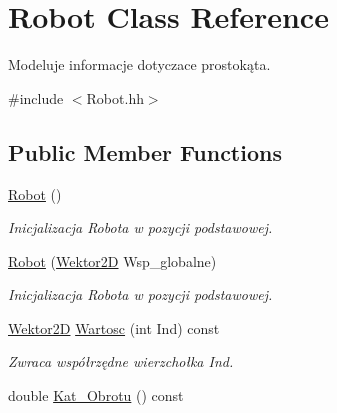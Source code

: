 \hypertarget{class_robot}{\section{Robot Class Reference}
\label{class_robot}
}


Modeluje informacje dotyczace prostokąta.  




{\ttfamily \#include $<$Robot.\+hh$>$}

\subsection*{Public Member Functions}
\begin{DoxyCompactItemize}
\item 
\hypertarget{class_robot_a4fc7c70ae20623f05e06f2ecb388b6c4}{\hyperlink{class_robot_a4fc7c70ae20623f05e06f2ecb388b6c4}{Robot} ()}\label{class_robot_a4fc7c70ae20623f05e06f2ecb388b6c4}

\begin{DoxyCompactList}\small\item\em Inicjalizacja Robota w pozycji podstawowej. \end{DoxyCompactList}\item 
\hypertarget{class_robot_a57616442d2907ac8a7e4e124d82b5ba3}{\hyperlink{class_robot_a57616442d2907ac8a7e4e124d82b5ba3}{Robot} (\hyperlink{class_wektor2_d}{Wektor2\+D} Wsp\+\_\+globalne)}\label{class_robot_a57616442d2907ac8a7e4e124d82b5ba3}

\begin{DoxyCompactList}\small\item\em Inicjalizacja Robota w pozycji podstawowej. \end{DoxyCompactList}\item 
\hypertarget{class_robot_aef89d67c7b58e5deb3a734fc816b800c}{\hyperlink{class_wektor2_d}{Wektor2\+D} \hyperlink{class_robot_aef89d67c7b58e5deb3a734fc816b800c}{Wartosc} (int Ind) const }\label{class_robot_aef89d67c7b58e5deb3a734fc816b800c}

\begin{DoxyCompactList}\small\item\em Zwraca współrzędne wierzchołka Ind. \end{DoxyCompactList}\item 
\hypertarget{class_robot_a3ec5e3a2db5fe429c765ed0a0d418eb8}{double \hyperlink{class_robot_a3ec5e3a2db5fe429c765ed0a0d418eb8}{Kat\+\_\+\+Obrotu} () const }\label{class_robot_a3ec5e3a2db5fe429c765ed0a0d418eb8}


\end{DoxyCompactItemize}
